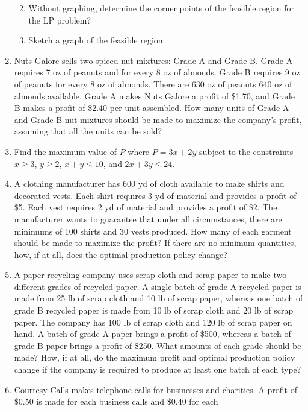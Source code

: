 \documentclass[
  letterpaper,
  DIV=11,
  numbers=noendperiod]{scrreprt}
\providecommand{\tightlist}{%
  \setlength{\itemsep}{0pt}\setlength{\parskip}{0pt}}\usepackage{longtable,booktabs,array}
\begin{document}
\begin{enumerate}
  \begin{enumerate}
  \def\labelenumii{\alph{enumii})}
  \tightlist
  \item
    Without graphing, determine the corner points of the feasible region
    for the LP problem?
  \item
    Sketch a graph of the feasible region.
  \end{enumerate}
\item
  Nuts Galore sells two spiced nut mixtures: Grade A and Grade B. Grade
  A requires 7 oz of peanuts and for every 8 oz of almonds. Grade B
  requires 9 oz of peanuts for every 8 oz of almonds. There are 630 oz
  of peanuts 640 oz of almonds available. Grade A makes Nuts Galore a
  profit of \$1.70, and Grade B makes a profit of \$2.40 per unit
  assembled. How many units of Grade A and Grade B nut mixtures should
  be made to maximize the company's profit, assuming that all the units
  can be sold?
\item
  Find the maximum value of \(P\) where \(P=3x+2y\) subject to the
  constraints \(x\ge3\), \(y\ge2\), \(x+y\le10\), and \(2x+3y\le24\).
\item
  A clothing manufacturer has 600 yd of cloth available to make shirts
  and decorated vests. Each shirt requires 3 yd of material and provides
  a profit of \$5. Each vest requires 2 yd of material and provides a
  profit of \$2. The manufacturer wants to guarantee that under all
  circumstances, there are minimums of 100 shirts and 30 vests produced.
  How many of each garment should be made to maximize the profit? If
  there are no minimum quantities, how, if at all, does the optimal
  production policy change?
\item
  A paper recycling company uses scrap cloth and scrap paper to make two
  different grades of recycled paper. A single batch of grade A recycled
  paper is made from 25 lb of scrap cloth and 10 lb of scrap paper,
  whereas one batch of grade B recycled paper is made from 10 lb of
  scrap cloth and 20 lb of scrap paper. The company has 100 lb of scrap
  cloth and 120 lb of scrap paper on hand. A batch of grade A paper
  brings a profit of \$500, whereas a batch of grade B paper brings a
  profit of \$250. What amounts of each grade should be made? How, if at
  all, do the maximum profit and optimal production policy change if the
  company is required to produce at least one batch of each type?
\item
  Courtesy Calls makes telephone calls for businesses and charities. A
  profit of \$0.50 is made for each business calls and \$0.40 for each

\end{enumerate}
\end{document}
